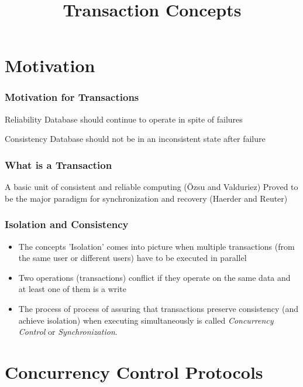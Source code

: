 \documentclass[12]{beamer}
\title{Transaction Concepts}
\date
\begin{document}
\maketitle

\section{Motivation}

\begin{frame}
  \frametitle{Motivation for Transactions}
  \begin{block}{Reliability}
    Database should continue to operate in spite of failures
  \end{block}
  \begin{block}{Consistency}
    Database should not be in an inconsistent state after failure
  \end{block}
\end{frame}

%
%
\begin{frame}
  \frametitle{What is a Transaction}
  \begin{definition}
    A basic unit of consistent and reliable computing (\"Ozsu and Valduriez)
    Proved to be the major paradigm for synchronization and recovery (Haerder and Reuter)
  \end{definition}
\vspace{5mm}
\end{frame}

\begin{frame}
  \frametitle{Isolation and Consistency}
  \begin{itemize}
    \addtolength{\itemsep}{10pt}
    \item   The concepts 'Isolation' comes into picture when multiple transactions (from the same user or different users) have to be executed in parallel
    \item Two operations (transactions) conflict if they operate on the same data and at least one of them is a write
    \item The process of process of assuring that transactions preserve consistency (and achieve isolation) when executing simultaneously is called \textit{Concurrency Control} or \textit{Synchronization}.
  \end{itemize}
\end{frame}

\section{Concurrency Control Protocols}
\end{document}
